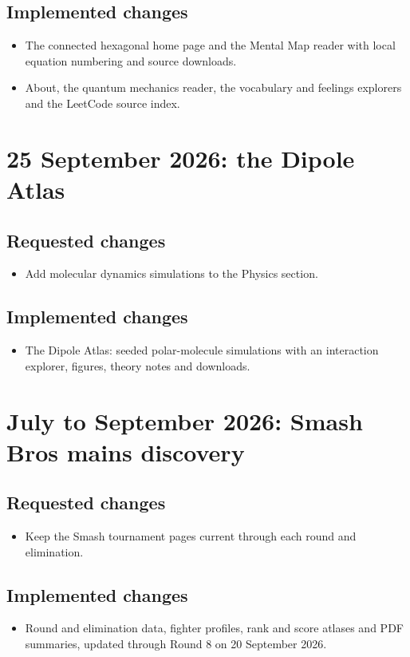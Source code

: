 \documentclass[11pt]{article}
\begin{document}
\subsection{Implemented changes}
\begin{itemize}
\item The connected hexagonal home page and the Mental Map reader with local equation numbering and source downloads.
\item About, the quantum mechanics reader, the vocabulary and feelings explorers and the LeetCode source index.
\end{itemize}

\section{25 September 2026: the Dipole Atlas}
\subsection{Requested changes}
\begin{itemize}
\item Add molecular dynamics simulations to the Physics section.
\end{itemize}
\subsection{Implemented changes}
\begin{itemize}
\item The Dipole Atlas: seeded polar-molecule simulations with an interaction explorer, figures, theory notes and downloads.
\end{itemize}

\section{July to September 2026: Smash Bros mains discovery}
\subsection{Requested changes}
\begin{itemize}
\item Keep the Smash tournament pages current through each round and elimination.
\end{itemize}
\subsection{Implemented changes}
\begin{itemize}
\item Round and elimination data, fighter profiles, rank and score atlases and PDF summaries, updated through Round 8 on 20 September 2026.
\end{itemize}
\end{document}
